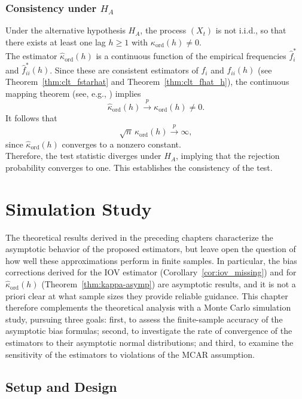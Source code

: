 ﻿\documentclass[12pt,a4paper]{scrreprt}
\theoremstyle{definition}
\begin{document}
\subsection{Consistency under $H_A$}
\label{subsec:serial-HA}

Under the alternative hypothesis $H_A$, the process $(X_t)$ is not i.i.d.,
so that there exists at least one lag $h \ge 1$ with 
$\kappa_{\mathrm{ord}}(h) \neq 0$.\\
The estimator $\hat{\kappa}_{\mathrm{ord}}(h)$ is a continuous function 
of the empirical frequencies $\hat{f}^*_i$ and $\hat{f}^*_{ii}(h)$.
Since these are consistent estimators of $f_i$ and $f_{ii}(h)$ (see Theorem~\ref{thm:clt_fstarhat} and Theorem~\ref{thm:clt_fhat_h}), 
the continuous mapping theorem (see, e.g., \citealp[Theorem 3.27]{kallenberg_2021}) implies
\[
\hat{\kappa}_{\mathrm{ord}}(h) \xrightarrow{p} 
\kappa_{\mathrm{ord}}(h) \neq 0.
\]
It follows that
\[
\sqrt{n}\,\hat{\kappa}_{\mathrm{ord}}(h) \xrightarrow{p} \infty,
\]
since $\hat{\kappa}_{\mathrm{ord}}(h)$ converges to a nonzero constant.\\
Therefore, the test statistic diverges under $H_A$, implying that 
the rejection probability converges to one. This establishes the 
consistency of the test.

\chapter{Simulation Study}
\label{chap:simulation}

The theoretical results derived in the preceding chapters characterize 
the asymptotic behavior of the proposed estimators, but leave open the 
question of how well these approximations perform in finite samples. 
In particular, the bias corrections derived for the IOV estimator 
(Corollary~\ref{cor:iov_missing}) and for $\hat{\kappa}_{\mathrm{ord}}(h)$ (Theorem~\ref{thm:kappa-asymp}) 
are asymptotic results, and it is not a priori clear at what sample 
sizes they provide reliable guidance. This chapter therefore complements 
the theoretical analysis with a Monte Carlo simulation study, pursuing 
three goals: first, to assess the finite-sample accuracy of the 
asymptotic bias formulas; second, to investigate the rate of convergence 
of the estimators to their asymptotic normal distributions; and third, 
to examine the sensitivity of the estimators to violations of the MCAR 
assumption.

\section{Setup and Design}
\label{sec:sim-setup}
\end{document}
